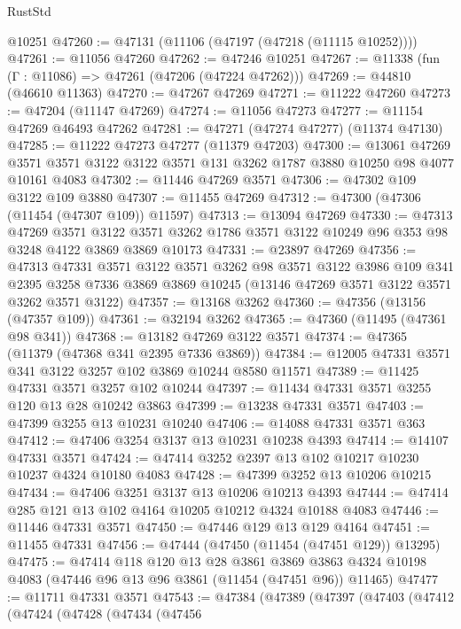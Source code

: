 \begin{lexlean}{RustStd}
\begin{coremodule}
    @10251
@47260 := @47131 (@11106 (@47197 (@47218 (@11115 @10252))))
@47261 := @11056 @47260
@47262 := @47246 @10251
@47267 := @11338 (fun (Γ : @11086) => @47261 (@47206 (@47224 @47262)))
@47269 := @44810 (@46610 @11363)
@47270 := @47267 @47269
@47271 := @11222 @47260
@47273 := @47204 (@11147 @47269)
@47274 := @11056 @47273
@47277 := @11154 @47269 @46493 @47262
@47281 := @47271 (@47274 @47277) (@11374 @47130)
@47285 := @11222 @47273 @47277 (@11379 @47203)
@47300 := @13061
    @47269
    @3571
    @3571
    @3122
    @3122
    @3571
    @131
    @3262
    @1787
    @3880
    @10250
    @98
    @4077
    @10161
    @4083
@47302 := @11446 @47269 @3571
@47306 := @47302 @109 @3122 @109 @3880
@47307 := @11455 @47269
@47312 := @47300 (@47306 (@11454 (@47307 @109)) @11597)
@47313 := @13094 @47269
@47330 := @47313
    @47269
    @3571
    @3122
    @3571
    @3262
    @1786
    @3571
    @3122
    @10249
    @96
    @353
    @98
    @3248
    @4122
    @3869
    @3869
    @10173
@47331 := @23897 @47269
@47356 := @47313
    @47331
    @3571
    @3122
    @3571
    @3262
    @98
    @3571
    @3122
    @3986
    @109
    @341
    @2395
    @3258
    @7336
    @3869
    @3869
    @10245
    (@13146 @47269 @3571 @3122 @3571 @3262 @3571 @3122)
@47357 := @13168 @3262
@47360 := @47356 (@13156 (@47357 @109))
@47361 := @32194 @3262
@47365 := @47360 (@11495 (@47361 @98 @341))
@47368 := @13182 @47269 @3122 @3571
@47374 := @47365 (@11379 (@47368 @341 @2395 @7336 @3869))
@47384 := @12005 @47331 @3571 @341 @3122 @3257 @102 @3869 @10244 @8580 @11571
@47389 := @11425 @47331 @3571 @3257 @102 @10244
@47397 := @11434 @47331 @3571 @3255 @120 @13 @28 @10242 @3863
@47399 := @13238 @47331 @3571
@47403 := @47399 @3255 @13 @10231 @10240
@47406 := @14088 @47331 @3571 @363
@47412 := @47406 @3254 @3137 @13 @10231 @10238 @4393
@47414 := @14107 @47331 @3571
@47424 := @47414 @3252 @2397 @13 @102 @10217 @10230 @10237 @4324 @10180 @4083
@47428 := @47399 @3252 @13 @10206 @10215
@47434 := @47406 @3251 @3137 @13 @10206 @10213 @4393
@47444 := @47414 @285 @121 @13 @102 @4164 @10205 @10212 @4324 @10188 @4083
@47446 := @11446 @47331 @3571
@47450 := @47446 @129 @13 @129 @4164
@47451 := @11455 @47331
@47456 := @47444 (@47450 (@11454 (@47451 @129)) @13295)
@47475 := @47414
    @118
    @120
    @13
    @28
    @3861
    @3869
    @3863
    @4324
    @10198
    @4083
    (@47446 @96 @13 @96 @3861 (@11454 (@47451 @96)) @11465)
@47477 := @11711 @47331 @3571
@47543 := @47384
    (@47389
      (@47397
        (@47403
          (@47412
            (@47424
              (@47428
                (@47434
                  (@47456

\end{coremodule}
\end{lexlean}
